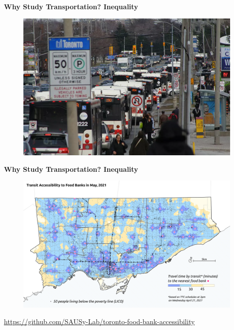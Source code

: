 \documentclass[aspectratio=169]{beamer}
\begin{document}


\begin{frame}
	\textbf{Why Study Transportation? Inequality}
	\begin{figure}
		\centering
		\includegraphics[width=0.8\linewidth]{images/ttc_traffic.png}
	\end{figure}
\end{frame}




\begin{frame}
	\textbf{Why Study Transportation? Inequality}
	\begin{figure}
		\centering
		\includegraphics[width=0.9\linewidth]{images/foodbanks_access.png}
	\end{figure}
	\tiny\url{https://github.com/SAUSy-Lab/toronto-food-bank-accessibility}
\end{frame}
\end{document}
